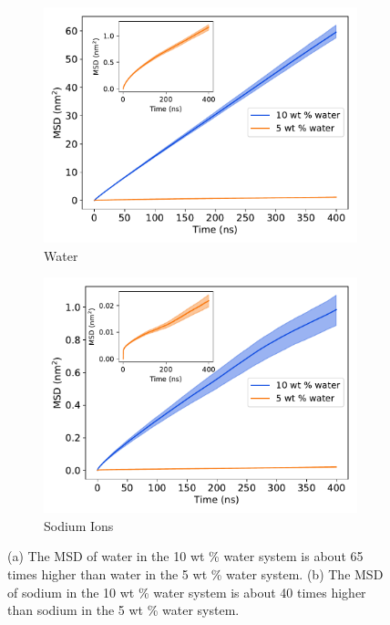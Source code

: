 \documentclass{article}
\begin{document}
  \begin{figure}[!htb]
  \centering
  \begin{subfigure}{0.45\textwidth}
  \includegraphics[width=\textwidth]{water_msd_comparison.pdf}
  \caption{Water}\label{fig:water_msd_comparison}
  \end{subfigure}
  \begin{subfigure}{0.45\textwidth}
  \includegraphics[width=\textwidth]{na_msd_comparison.pdf}
  \caption{Sodium Ions}\label{fig:na_msd_comparison}
  \end{subfigure}
  \caption{(a) The MSD of water in the 10 wt \% water system is about 65 times
  higher than water in the 5 wt \% water system. (b) The MSD of sodium in the
  10 wt \% water system is about 40 times higher than sodium in the 5 wt \% 
  water system.}\label{fig:msd_comparison}
  \end{figure}
  
\end{document}
